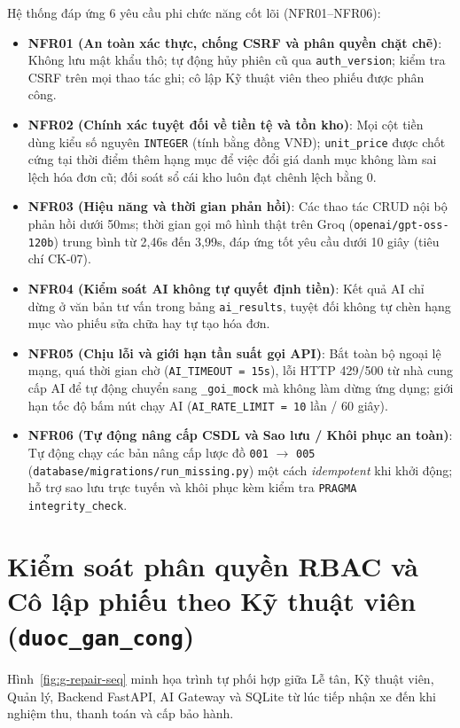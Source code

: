 Hệ thống đáp ứng 6 yêu cầu phi chức năng cốt lõi (NFR01--NFR06):
\begin{itemize}[noitemsep,topsep=2pt]
  \item \textbf{NFR01 (An toàn xác thực, chống CSRF và phân quyền chặt chẽ)}: Không lưu mật khẩu thô; tự động hủy phiên cũ qua \texttt{auth\_version}; kiểm tra CSRF trên mọi thao tác ghi; cô lập Kỹ thuật viên theo phiếu được phân công.
  \item \textbf{NFR02 (Chính xác tuyệt đối về tiền tệ và tồn kho)}: Mọi cột tiền dùng kiểu số nguyên \texttt{INTEGER} (tính bằng đồng VNĐ); \texttt{unit\_price} được chốt cứng tại thời điểm thêm hạng mục để việc đổi giá danh mục không làm sai lệch hóa đơn cũ; đối soát sổ cái kho luôn đạt chênh lệch bằng 0.
  \item \textbf{NFR03 (Hiệu năng và thời gian phản hồi)}: Các thao tác CRUD nội bộ phản hồi dưới 50ms; thời gian gọi mô hình thật trên Groq (\texttt{openai/gpt-oss-120b}) trung bình từ 2,46s đến 3,99s, đáp ứng tốt yêu cầu dưới 10 giây (tiêu chí CK-07).
  \item \textbf{NFR04 (Kiểm soát AI không tự quyết định tiền)}: Kết quả AI chỉ dừng ở văn bản tư vấn trong bảng \texttt{ai\_results}, tuyệt đối không tự chèn hạng mục vào phiếu sửa chữa hay tự tạo hóa đơn.
  \item \textbf{NFR05 (Chịu lỗi và giới hạn tần suất gọi API)}: Bắt toàn bộ ngoại lệ mạng, quá thời gian chờ (\texttt{AI\_TIMEOUT = 15s}), lỗi HTTP 429/500 từ nhà cung cấp AI để tự động chuyển sang \texttt{\_goi\_mock} mà không làm dừng ứng dụng; giới hạn tốc độ bấm nút chạy AI (\texttt{AI\_RATE\_LIMIT = 10} lần / 60 giây).
  \item \textbf{NFR06 (Tự động nâng cấp CSDL và Sao lưu / Khôi phục an toàn)}: Tự động chạy các bản nâng cấp lược đồ \texttt{001} $\rightarrow$ \texttt{005} (\texttt{database/migrations/run\_missing.py}) một cách \textit{idempotent} khi khởi động; hỗ trợ sao lưu trực tuyến và khôi phục kèm kiểm tra \texttt{PRAGMA integrity\_check}.
\end{itemize}

\section{Kiểm soát phân quyền RBAC và Cô lập phiếu theo Kỹ thuật viên (\texttt{duoc\_gan\_cong})}

Hình~\ref{fig:g-repair-seq} minh họa trình tự phối hợp giữa Lễ tân, Kỹ thuật viên, Quản lý, Backend FastAPI, AI Gateway và SQLite từ lúc tiếp nhận xe đến khi nghiệm thu, thanh toán và cấp bảo hành.

